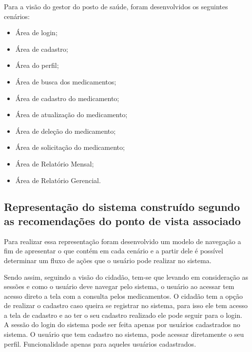 Para a visão do gestor do posto de saúde, foram desenvolvidos os seguintes cenários:

\begin{itemize}
    \item Área de login;
    \item Área de cadastro;
    \item Área do perfil;
    \item Área de busca dos medicamentos;
    \item Área de cadastro do medicamento;
    \item Área de atualização do medicamento;
    \item Área de deleção do medicamento;
    \item Área de solicitação do medicamento;
    \item Área de Relatório Mensal;
    \item Área de Relatório Gerencial.
\end{itemize}

\subsection{Representação do sistema construído segundo as recomendações do ponto de vista associado}

Para realizar essa representação foram desenvolvido um modelo de navegação a fim de apresentar o que contém em cada cenário e a partir dele é possível determinar um fluxo de ações que o usuário pode realizar no sistema. 

Sendo assim, seguindo a visão do cidadão, tem-se que levando em consideração as sessões e como o usuário deve navegar pelo sistema, o usuário ao acessar tem acesso direto a tela com a consulta pelos medicamentos.
O cidadão tem a opção de realizar o cadastro caso queira se registrar no sistema, para isso ele tem acesso a tela de cadastro e ao ter o seu cadastro realizado ele pode seguir para o login.
A sessão do login do sistema pode ser feita apenas por usuários cadastrados no sistema. 
O usuário que tem cadastro no sistema, pode acessar diretamente o seu perfil. Funcionalidade apenas para aqueles usuários cadastrados.

